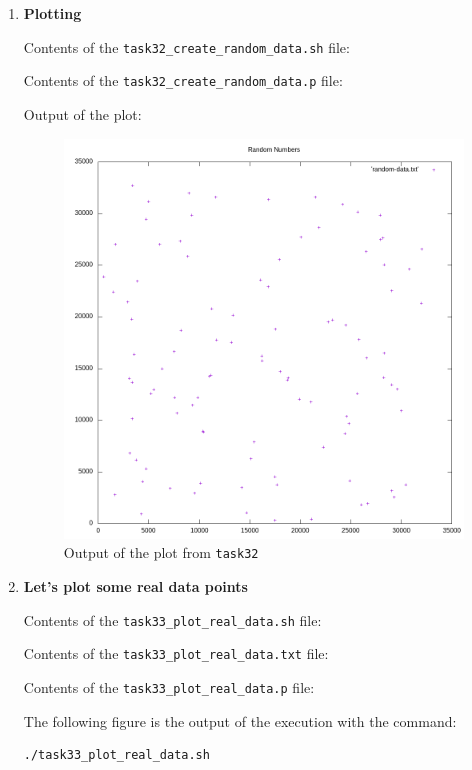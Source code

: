 \documentclass[9pt]{article}
\begin{document}
\begin{enumerate}
	\item \textbf{Plotting}
	
		Contents of the \texttt{task32\_create\_random\_data.sh} file:

		Contents of the \texttt{task32\_create\_random\_data.p} file:
		
		\newpage
		Output of the plot:
		\begin{figure}[h!]
			\centering
			\includegraphics[width=14cm]{../task32_create_random_data}
			\caption{Output of the plot from \texttt{task32}}
		\end{figure}

	\item \textbf{Let's plot some real data points}

		Contents of the \texttt{task33\_plot\_real\_data.sh} file:

		Contents of the \texttt{task33\_plot\_real\_data.txt} file:

		Contents of the \texttt{task33\_plot\_real\_data.p} file:
		
		The following figure is the output of the execution with the command:
		\begin{lstlisting}
./task33_plot_real_data.sh            
		\end{lstlisting}
	

\end{enumerate}
\end{document}
